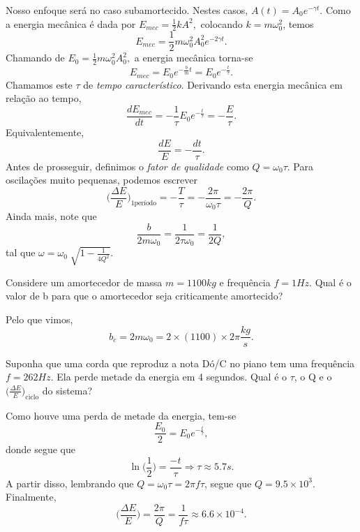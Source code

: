 \documentclass[physicsII_notes.tex]{subfiles}
\begin{document}
Nosso enfoque será no caso subamortecido. Nestes casos, \(A(t) = A_{0}e^{-\gamma t}.\) Como
a energia mecânica é dada por \(E_{mec} = \frac{1}{2}kA^{2},\) colocando \(k=m\omega_{0}^{2}\), temos
\[
	E_{mec} = \frac{1}{2}m\omega_{0}^{2}A_{0}^{2}e^{-2\gamma t}.
\]
Chamando de \(E_{0} = \frac{1}{2}m\omega_{0}^{2}A_{0}^{2},\) a energia mecânica torna-se
\[
	E_{mec} = E_{0}e^{-\frac{b}{m}t} = E_{0}e^{-\frac{t}{\tau }}.
\]
Chamamos este \(\tau \) de \textit{tempo característico}. Derivando esta energia mecânica em relação ao tempo,
\[
	\frac{dE_{mec}}{dt} = -\frac{1}{\tau }E_{0} e^{-\frac{t}{\tau }} = -\frac{E}{\tau }.
\]
Equivalentemente,
\[
	\frac{dE}{E} = -\frac{dt}{\tau }.
\]
Antes de prosseguir, definimos o \textit{fator de qualidade} como \(Q = \omega_{0}\tau \). Para
oscilações muito pequenas, podemos escrever
\[
	\biggl(\frac{\Delta E}{E}\biggr)_{1\text{período}} = -\frac{T}{\tau } = -\frac{2\pi }{\omega_{0}\tau } = -\frac{2\pi }{Q}.
\]
Ainda mais, note que
\[
	\frac{b}{2m\omega_{0}} = \frac{1}{2\tau \omega_{0}} = \frac{1}{2Q},
\]
tal que \(\omega = \omega_{0}\sqrt[]{1 - \frac{1}{4Q^{2}}}\).
\begin{example}
	Considere um amortecedor de massa \(m=1100kg\) e frequência \(f = 1Hz\). Qual é o valor de b para que o amortecedor
	seja criticamente amortecido?

	Pelo que vimos,
	\[
		b_{c} = 2m\omega_{0} = 2\times(1100)\times 2\pi \frac{kg}{s}.
	\]
\end{example}
\begin{example}
	Suponha que uma corda que reproduz a nota Dó/C no piano tem uma frequência \(f = 262Hz\). Ela perde metade
	da energia em 4 segundos. Qual é o \(\tau \), o Q e o \(\biggl(\frac{\Delta E}{E}\biggr)_{\text{ciclo}}\) do sistema?

	Como houve uma perda de metade da energia, tem-se
	\[
		\frac{E_{0}}{2} = E_{0}e^{-\frac{t}{\tau }},
	\]
	donde segue que
	\[
		\ln \biggl(\frac{1}{2}\biggr) = \frac{-t}{\tau } \Rightarrow \tau \approx 5.7s.
	\]
	A partir disso, lembrando que \(Q = \omega_{0}\tau  = 2\pi f \tau \), segue que \(Q = 9.5\times 10^{3}.\) Finalmente,
	\[
		\biggl(\frac{\Delta E}{E}\biggr) = \frac{2\pi }{Q} = \frac{1}{f\tau }\approx 6.6\times 10^{-4}.
	\]
\end{example}
\end{document}
